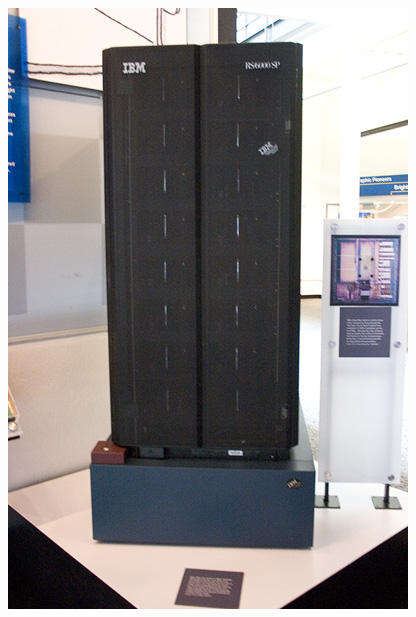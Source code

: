 \documentclass[12pt, aspectratio=169]{beamer}
\begin{document}
\begin{frame}
\begin{columns}[c]
\begin{figure}
  \includegraphics[width=1\linewidth]{Deep_Blue.jpg}
\end{figure}
\end{columns}
\end{frame}
\end{document}
